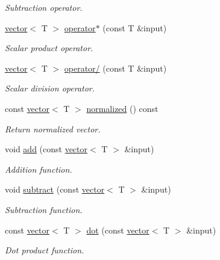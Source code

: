 \begin{DoxyCompactItemize}
\begin{DoxyCompactList}\small\item\em Subtraction operator. \end{DoxyCompactList}\item 
\hyperlink{classddd_1_1vector}{vector}$<$ T $>$ \hyperlink{classddd_1_1vector_a9ba05f9c13f8d9cd23f5a5657fcfa948}{operator$\ast$} (const T \&input)
\begin{DoxyCompactList}\small\item\em Scalar product operator. \end{DoxyCompactList}\item 
\hyperlink{classddd_1_1vector}{vector}$<$ T $>$ \hyperlink{classddd_1_1vector_a837824860826c44950c2c48d4bd247e3}{operator/} (const T \&input)
\begin{DoxyCompactList}\small\item\em Scalar division operator. \end{DoxyCompactList}\item 
\mbox{\label{classddd_1_1vector_a40b593b08a2dd6af92c5c07bb9faa463}} 
const \hyperlink{classddd_1_1vector}{vector}$<$ T $>$ \hyperlink{classddd_1_1vector_a40b593b08a2dd6af92c5c07bb9faa463}{normalized} () const
\begin{DoxyCompactList}\small\item\em Return normalized vector. \end{DoxyCompactList}\item 
void \hyperlink{classddd_1_1vector_a97eca6a6625002022ab2442b5cbd0462}{add} (const \hyperlink{classddd_1_1vector}{vector}$<$ T $>$ \&input)
\begin{DoxyCompactList}\small\item\em Addition function. \end{DoxyCompactList}\item 
void \hyperlink{classddd_1_1vector_abf367c7da55ad2c770a90a3ed3c01d5a}{subtract} (const \hyperlink{classddd_1_1vector}{vector}$<$ T $>$ \&input)
\begin{DoxyCompactList}\small\item\em Subtraction function. \end{DoxyCompactList}\item 
const \hyperlink{classddd_1_1vector}{vector}$<$ T $>$ \hyperlink{classddd_1_1vector_a61e3ccdb85f4d41c142c80b429808baf}{dot} (const \hyperlink{classddd_1_1vector}{vector}$<$ T $>$ \&input)
\begin{DoxyCompactList}\small\item\em Dot product function. \end{DoxyCompactList}\item 

\end{DoxyCompactItemize}
